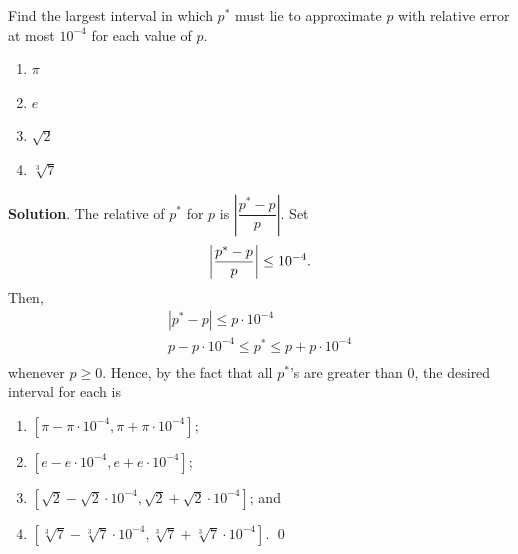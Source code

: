 \documentclass[11pt]{article}
\theoremstyle{break}
\numberwithin{equation}{theorem}
\begin{document}
\newpage
\begin{problem}\label{problem 5}
    Find the largest interval in which $p^\ast$ must lie to approximate $p$ with relative error at most $10^{-4}$ for each value of $p$.
    \begin{enumerate}
        \item $\pi$
        \item $e$
        \item $\sqrt{2}$
        \item $\sqrt[3]{7}$
    \end{enumerate}
\end{problem}
\textbf{Solution}. The relative of $p^\ast$ for $p$ is $\left|\dfrac{p^{\ast}-p}{p}\right|$. Set \vspace{-0.6em}
\begin{equation*}
    \left|\dfrac{p^{\ast}-p}{p}\right|\leq 10^{-4}. \vspace{-0.6em}
\end{equation*}
Then, \vspace{-0.6em}
\begin{align*}
    \left|p^{\ast}-p\right|\leq p\cdot 10^{-4}\\
    p-p\cdot 10^{-4}\leq p^\ast\leq p+p\cdot 10^{-4}\\[-3.4em]
\end{align*}
whenever $p\geq 0$. Hence, by the fact that all $p^\ast$'s are greater than $0$, the desired interval for each is
\begin{enumerate}
    \item $\left[\pi-\pi\cdot10^{-4}, \pi+\pi\cdot10^{-4}\right]$;
    \item $\left[e-e\cdot10^{-4}, e+e\cdot10^{-4}\right]$;
    \item $\left[\sqrt{2}-\sqrt{2}\cdot10^{-4}, \sqrt{2}+\sqrt{2}\cdot10^{-4}\right]$; and
    \item $\left[\sqrt[3]{7}-\sqrt[3]{7}\cdot10^{-4}, \sqrt[3]{7}+\sqrt[3]{7}\cdot10^{-4}\right]$. \qed
\end{enumerate}
\end{document}
